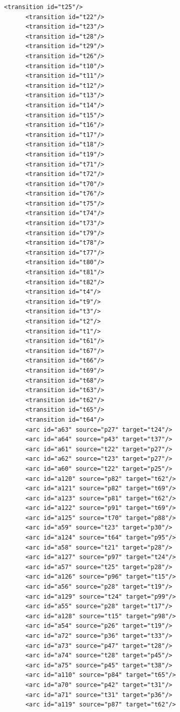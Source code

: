 \begin{multicols}{2}
\begin{lstlisting}[basicstyle=\ttfamily\tiny]
      <transition id="t25"/>
      <transition id="t22"/>
      <transition id="t23"/>
      <transition id="t28"/>
      <transition id="t29"/>
      <transition id="t26"/>
      <transition id="t10"/>
      <transition id="t11"/>
      <transition id="t12"/>
      <transition id="t13"/>
      <transition id="t14"/>
      <transition id="t15"/>
      <transition id="t16"/>
      <transition id="t17"/>
      <transition id="t18"/>
      <transition id="t19"/>
      <transition id="t71"/>
      <transition id="t72"/>
      <transition id="t70"/>
      <transition id="t76"/>
      <transition id="t75"/>
      <transition id="t74"/>
      <transition id="t73"/>
      <transition id="t79"/>
      <transition id="t78"/>
      <transition id="t77"/>
      <transition id="t80"/>
      <transition id="t81"/>
      <transition id="t82"/>
      <transition id="t4"/>
      <transition id="t9"/>
      <transition id="t3"/>
      <transition id="t2"/>
      <transition id="t1"/>
      <transition id="t61"/>
      <transition id="t67"/>
      <transition id="t66"/>
      <transition id="t69"/>
      <transition id="t68"/>
      <transition id="t63"/>
      <transition id="t62"/>
      <transition id="t65"/>
      <transition id="t64"/>
      <arc id="a63" source="p27" target="t24"/>
      <arc id="a64" source="p43" target="t37"/>
      <arc id="a61" source="t22" target="p27"/>
      <arc id="a62" source="t23" target="p27"/>
      <arc id="a60" source="t22" target="p25"/>
      <arc id="a120" source="p82" target="t62"/>
      <arc id="a121" source="p82" target="t69"/>
      <arc id="a123" source="p81" target="t62"/>
      <arc id="a122" source="p91" target="t69"/>
      <arc id="a125" source="t70" target="p88"/>
      <arc id="a59" source="t23" target="p30"/>
      <arc id="a124" source="t64" target="p95"/>
      <arc id="a58" source="t21" target="p28"/>
      <arc id="a127" source="p97" target="t24"/>
      <arc id="a57" source="t25" target="p28"/>
      <arc id="a126" source="p96" target="t15"/>
      <arc id="a56" source="p28" target="t19"/>
      <arc id="a129" source="t24" target="p99"/>
      <arc id="a55" source="p28" target="t17"/>
      <arc id="a128" source="t15" target="p98"/>
      <arc id="a54" source="p26" target="t19"/>
      <arc id="a72" source="p36" target="t33"/>
      <arc id="a73" source="p47" target="t28"/>
      <arc id="a74" source="t28" target="p45"/>
      <arc id="a75" source="p45" target="t38"/>
      <arc id="a110" source="p84" target="t65"/>
      <arc id="a70" source="p42" target="t31"/>
      <arc id="a71" source="t31" target="p36"/>
      <arc id="a119" source="p87" target="t62"/>

\end{lstlisting}
\end{multicols}
